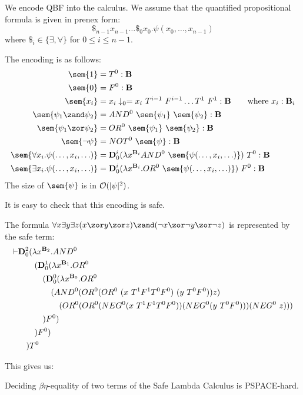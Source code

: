We encode QBF into the calculus.
We assume that the quantified propositional formula is given in prenex form:
$$\$_{n-1} x_{n-1} \ldots \$_0 x_0 . \psi(x_0, \ldots, x_{n-1})$$
where $\$_i \in \{\exists,\forall\}$ for $0\leq i\leq n-1$.

The encoding is as follows:
\begin{align*}
\sem{1} &= T^0  : \booltype \\
\sem{0} &= F^0 : \booltype \\
\sem{x_i} &= x_i\downarrow_0 = x_i~T^{i-1}~F^{i-1}\ldots T^1~F^1: \booltype \qquad \hbox{where $x_i:\booltype_i$}\\
\sem{\psi_1\zand \psi_2} &= AND^0~\sem{\psi_1}~\sem{\psi_2}
:\booltype  \\
\sem{\psi_1\zor \psi_2} &= OR^0~\sem{\psi_1}~\sem{\psi_2}
:\booltype  \\
\sem{\neg \psi} &= NOT^0~\sem{\psi}
:\booltype  \\
\sem{\forall x_i.\psi(\ldots, x_i, \ldots)} & = \mathbf{D}_0^i(\lambda x^{\booltype_i} AND^0~\sem{\psi(\ldots, x_i, \ldots)})~T^0 :\booltype\\
\sem{\exists x_i.\psi(\ldots, x_i, \ldots)} & = \mathbf{D}_0^i(\lambda x^{\booltype_i}.OR^0~\sem{\psi(\ldots, x_i, \ldots)})~F^0 :\booltype
\end{align*}
The size of $\sem{\psi}$ is in $\mathcal{O}(|\psi|^2)$.

It is easy to check that this encoding is safe.
\begin{example}
  The formula $\forall x \exists y \exists z (x\zor y\zor z)\zand(\neg x\zor \neg y\zor \neg z)$ is represented by the safe term:
\begin{align*}
\vdash &\mathbf{D}_0^2(\lambda x^{\mathbf{B}_2}. AND^0\\
&\quad\quad (\mathbf{D}_0^1(\lambda x^{\mathbf{B}_1}.OR^0\\
&\quad\quad\quad (\mathbf{D}_0^0(\lambda x^{\mathbf{B}_0}.OR^0\\
&\quad\quad\quad\quad (AND^0 (OR^0(OR^0~(x~T^1 F^1 T^0 F^0)~(y~T^0 F^0))z) \\
&\quad\quad\quad\quad\quad (OR^0(OR^0(NEG^0 (x~T^1 F^1 T^0 F^0))(NEG^0 (y~T^0 F^0)))(NEG^0~z))) \\
&\quad\quad\quad )F^0)\\
&\quad\quad)F^0)\\
&\quad) T^0
\end{align*}
\end{example}
This gives us:
\begin{theorem}
  Deciding $\beta\eta$-equality of two terms of the Safe Lambda Calculus is PSPACE-hard.
\end{theorem}


